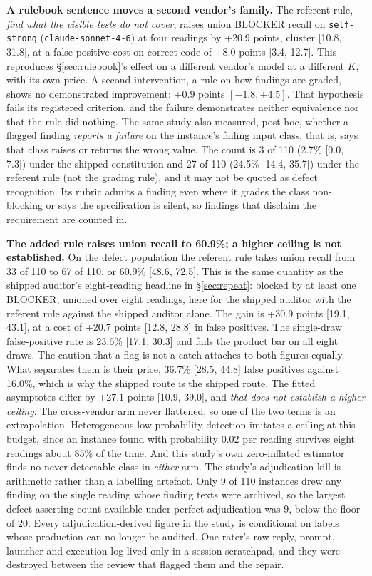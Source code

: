 \textbf{A rulebook sentence moves a second vendor's family.} The referent rule, \emph{find what the
visible tests do not cover}, raises union BLOCKER recall on \texttt{self-strong} (\texttt{claude-sonnet-4-6})
at four readings by +20.9 points, cluster [10.8, 31.8], at a false-positive cost on
correct code of +8.0 points [3.4, 12.7]. This reproduces \S\ref{sec:rulebook}'s effect on a different vendor's model at a
different $K$, with its own price. A second intervention, a rule on how findings are graded, shows
no demonstrated improvement: $+0.9$ points $[-1.8, +4.5]$. That hypothesis fails its registered
criterion, and the failure demonstrates neither equivalence nor that the rule did nothing. The
same study also measured, post hoc, whether a flagged finding \emph{reports a failure} on the
instance's failing input class, that is, says that class raises or returns the wrong value. The
count is 3 of 110 (2.7\% [0.0, 7.3]) under the shipped constitution and 27 of 110 (24.5\%
[14.4, 35.7]) under the referent rule (not the grading rule), and it may not be
quoted as defect recognition. Its rubric admits a finding even
where it grades the class non-blocking or says the specification is silent, so findings that
disclaim the requirement are counted in.

\textbf{The added rule raises union recall to 60.9\%; a higher ceiling is not established.}
On the defect population the referent rule takes union recall from 33 of 110 to 67 of 110, or 60.9\%
[48.6, 72.5]. This is the same quantity as the shipped auditor's eight-reading headline in
\S\ref{sec:repeat}: blocked by at least one BLOCKER, unioned over eight readings, here for the
shipped auditor with the referent rule against the shipped auditor alone. The gain is +30.9 points [19.1, 43.1], at a cost of +20.7 points
[12.8, 28.8] in false positives. The single-draw false-positive rate is 23.6\% [17.1, 30.3] and
fails the product bar on all eight draws. The caution that a flag is not a catch attaches to both figures equally. What separates
them is their price, 36.7\% [28.5, 44.8] false positives against 16.0\%, which is why the shipped
route is the shipped route. The fitted asymptotes differ by $+27.1$ points [10.9, 39.0], and
\emph{that does not establish a higher ceiling}. The cross-vendor arm never flattened, so one of
the two terms is an extrapolation. Heterogeneous low-probability detection imitates a ceiling at
this budget, since an instance found with probability $0.02$ per reading survives eight readings
about 85\% of the time. And this study's own zero-inflated estimator finds no never-detectable
class in \emph{either} arm. The study's adjudication kill is arithmetic rather than a labelling
artefact. Only 9 of 110 instances drew any finding on the single reading whose finding texts were
archived, so the largest defect-asserting count available under perfect adjudication was 9, below
the floor of 20. Every adjudication-derived figure in the study is conditional on labels whose
production can no longer be audited. One rater's raw reply, prompt, launcher and execution log
lived only in a session scratchpad, and they were destroyed between the review that flagged them
and the repair.

